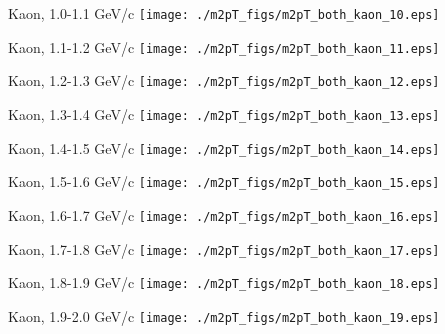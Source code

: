\documentclass[compress]{beamer} %
\begin{document}
\begin{frame}{Kaon, 1.0-1.1 GeV/c}
\texttt{[image: ./m2pT\_figs/m2pT\_both\_kaon\_10.eps]}
\end{frame}
\begin{frame}{Kaon, 1.1-1.2 GeV/c}
\texttt{[image: ./m2pT\_figs/m2pT\_both\_kaon\_11.eps]}
\end{frame}
\begin{frame}{Kaon, 1.2-1.3 GeV/c}
\texttt{[image: ./m2pT\_figs/m2pT\_both\_kaon\_12.eps]}
\end{frame}
\begin{frame}{Kaon, 1.3-1.4 GeV/c}
\texttt{[image: ./m2pT\_figs/m2pT\_both\_kaon\_13.eps]}
\end{frame}
\begin{frame}{Kaon, 1.4-1.5 GeV/c}
\texttt{[image: ./m2pT\_figs/m2pT\_both\_kaon\_14.eps]}
\end{frame}
\begin{frame}{Kaon, 1.5-1.6 GeV/c}
\texttt{[image: ./m2pT\_figs/m2pT\_both\_kaon\_15.eps]}
\end{frame}
\begin{frame}{Kaon, 1.6-1.7 GeV/c}
\texttt{[image: ./m2pT\_figs/m2pT\_both\_kaon\_16.eps]}
\end{frame}
\begin{frame}{Kaon, 1.7-1.8 GeV/c}
\texttt{[image: ./m2pT\_figs/m2pT\_both\_kaon\_17.eps]}
\end{frame}
\begin{frame}{Kaon, 1.8-1.9 GeV/c}
\texttt{[image: ./m2pT\_figs/m2pT\_both\_kaon\_18.eps]}
\end{frame}
\begin{frame}{Kaon, 1.9-2.0 GeV/c}
\texttt{[image: ./m2pT\_figs/m2pT\_both\_kaon\_19.eps]}
\end{frame}





\end{document}
